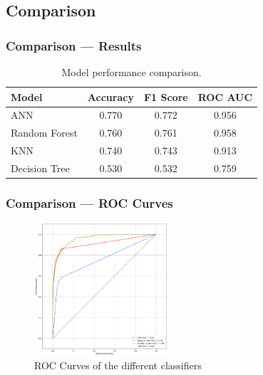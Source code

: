 \documentclass[10pt, aspectratio=169]{beamer}
\begin{document}
\subsection{Comparison}
\begin{frame}
    \frametitle{Comparison --- Results}
    \begin{table}[h!]
        \centering
        \begin{tabular}{|l|c|c|c|}
        \hline
        \textbf{Model}         & \textbf{Accuracy} & \textbf{F1 Score } & \textbf{ROC AUC } \\ \hline
        ANN                    & 0.770             & 0.772                       & 0.956                   \\ \hline
        Random Forest          & 0.760             & 0.761                       & 0.958                   \\ \hline
        KNN                    & 0.740             & 0.743                       & 0.913                   \\ \hline
        Decision Tree          & 0.530             & 0.532                       & 0.759                   \\ \hline
       
        
        \end{tabular}
        \caption{Model performance comparison.}
        \label{tab:model_performance}
        \end{table}

\end{frame}
\begin{frame}
    \frametitle{Comparison --- ROC Curves}
    \begin{figure}
        \centering
        \includegraphics[width=0.44\textwidth]{img/roc.png}
        \caption{ROC Curves of the different classifiers}
    \end{figure}
\end{frame}
\end{document}
